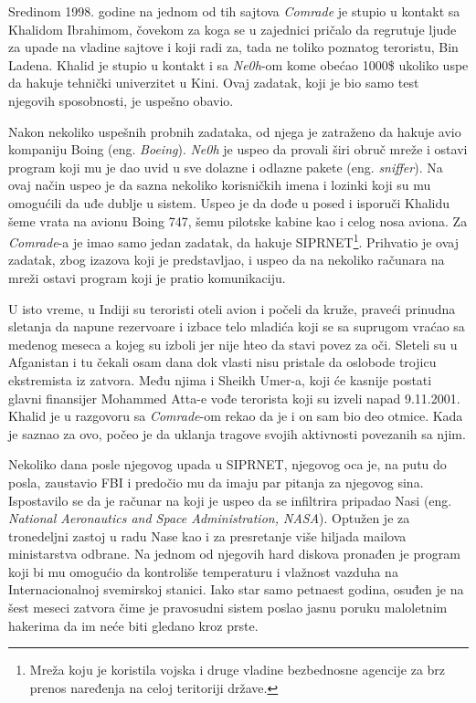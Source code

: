 \documentclass[a4paper]{article}
\begin{document}
Sredinom 1998. godine na jednom od tih sajtova \textit{Comrade} je stupio u kontakt sa Khalidom Ibrahimom, čovekom za koga se u zajednici pričalo da regrutuje ljude za upade na vladine sajtove i koji radi za, tada ne toliko poznatog teroristu, Bin Ladena. Khalid je stupio u kontakt i sa \textit{Ne0h}-om kome obećao 1000\$ ukoliko uspe da hakuje tehnički univerzitet u Kini. Ovaj zadatak, koji je bio samo test njegovih sposobnosti, je uspešno obavio.

Nakon nekoliko uspešnih probnih zadataka, od njega je zatraženo da hakuje avio kompaniju Boing (eng. \textit{Boeing}). \textit{Ne0h} je uspeo da provali širi obruč mreže i ostavi program koji mu je dao uvid u sve dolazne i odlazne pakete (eng. \textit{sniffer}). Na ovaj način uspeo je da sazna nekoliko korisničkih imena i lozinki koji su mu omogućili da uđe dublje u sistem. Uspeo je da dođe u posed i isporuči Khalidu šeme vrata na avionu Boing 747, šemu pilotske kabine kao i celog nosa aviona. Za \textit{Comrade}-a je imao samo jedan zadatak, da hakuje SIPRNET\footnote{Mreža koju je koristila vojska i druge vladine bezbednosne agencije za brz prenos naređenja na celoj teritoriji države.}. Prihvatio je ovaj zadatak, zbog izazova koji je predstavljao, i uspeo da na nekoliko računara na mreži ostavi program koji je pratio komunikaciju.

U isto vreme, u Indiji su teroristi oteli avion i počeli da kruže, praveći prinudna sletanja da napune rezervoare i izbace telo mladića koji se sa suprugom vraćao sa medenog meseca a kojeg su izboli jer nije hteo da stavi povez za oči. Sleteli su u Afganistan i tu čekali osam dana dok vlasti nisu pristale da oslobode trojicu ekstremista iz zatvora. Među njima i Sheikh Umer-a, koji će kasnije postati glavni finansijer Mohammed Atta-e vođe terorista koji su izveli napad 9.11.2001. Khalid je u razgovoru sa \textit{Comrade}-om rekao da je i on sam bio deo otmice. Kada je saznao za ovo, počeo je da uklanja tragove svojih aktivnosti povezanih sa njim.

Nekoliko dana posle njegovog upada u SIPRNET, njegovog oca je, na putu do posla, zaustavio FBI i predočio mu da imaju par pitanja za njegovog sina. Ispostavilo se da je računar na koji je uspeo da se infiltrira pripadao Nasi (eng. \textit{National Aeronautics and Space Administration, NASA}). Optužen je za tronedeljni zastoj u radu Nase kao i za presretanje više hiljada mailova ministarstva odbrane. Na jednom od njegovih hard diskova pronađen je program koji bi mu omogućio da kontroliše temperaturu i vlažnost vazduha na Internacionalnoj svemirskoj stanici. Iako star samo petnaest godina, osuđen je na šest meseci zatvora čime je pravosudni sistem poslao jasnu poruku maloletnim hakerima da im neće biti gledano kroz prste. 
\end{document}
